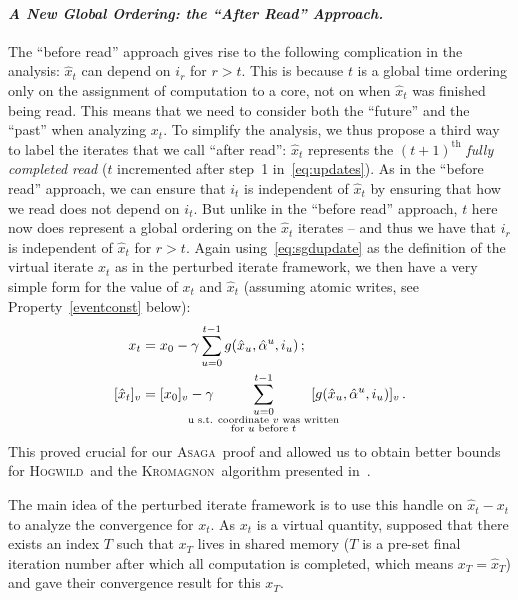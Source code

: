 \documentclass[twoside, 11pt]{article}
\newcommand{\stepsize}{\gamma}
\newcommand{\ASAGA}{\textsc{Asaga}}
\newcommand{\Hogwild}{\textsc{Hogwild}}
\newcommand{\KROMAGNON}{\textsc{Kromagnon}}
\begin{document}
\paragraph{\textit{A New Global Ordering: the ``After Read'' Approach.}}
The ``before read'' approach gives rise to the following complication in the analysis: $\hat{x}_t$ can depend on $i_r$ for $r > t$.
This is because $t$ is a global time ordering only on the assignment of computation to a core, not on when  $\hat{x}_t$ was finished being read.
This means that we need to consider both the ``future'' and the ``past'' when analyzing $x_t$.
To simplify the analysis, we thus propose a third way to label the iterates that we call ``after read'': $\hat{x}_t$ represents the $(t+1)^{\mathrm{th}}$ \emph{fully completed read} ($t$ incremented after step~1 in~\ref{eq:updates}).
As in the ``before read'' approach, we can ensure that $i_t$ is independent of $\hat{x}_t$ by ensuring that how we read does not depend on $i_t$.
But unlike in the ``before read'' approach, $t$ here now does represent a global ordering on the $\hat{x}_t$ iterates -- and thus we have that $i_r$ is independent of $\hat{x}_t$ for $r > t$.
Again using~\eqref{eq:sgdupdate} as the definition of the virtual iterate $x_t$ as in the perturbed iterate framework, we then have a very simple form for the value of $x_t$ and $\hat{x}_t$ (assuming atomic writes, see Property~\ref{eventconst} below):
\begin{equation} \label{eq:xhatUpdates}
\begin{aligned}
x_t &= x_0 - \stepsize \sum_{u = 0}^{t-1} g(\hat x_u, \hat \alpha^u, i_u) \, ;
\\
[\hat{x}_t]_v &= [x_0]_v - \stepsize
\mkern-36mu \sum_{\substack{u = 0 \\
		\text{u s.t. coordinate $v$ was written}\\
		\text{for $u$ before $t$} }
}^{t-1} \mkern-36mu  [g(\hat x_u, \hat \alpha^u, i_u)]_v \, .
\end{aligned}
\end{equation}
This proved crucial for our \ASAGA\ proof and allowed us to obtain better bounds for \Hogwild\ and the \KROMAGNON\ algorithm presented in~\citet{mania}.

The main idea of the perturbed iterate framework is to use this handle on $\hat x_t - x_t$ to analyze the convergence for $x_t$.
As $x_t$ is a virtual quantity, \citet{mania} supposed that there exists an index $T$ such that $x_T$ lives in shared memory ($T$ is a pre-set final iteration number after which all computation is completed, which means $x_T = \hat x_T$) and gave their convergence result for this $x_T$.
\end{document}
